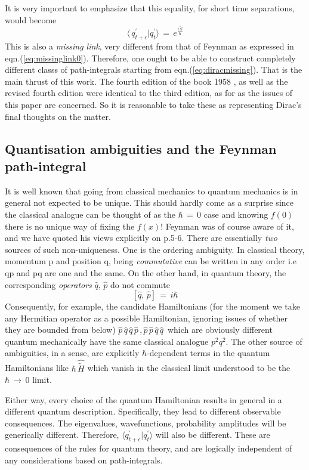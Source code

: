 \documentclass[a4paper]{JHEP3}
\newcommand{\be}{\begin{equation}}
\newcommand{\ee}{\end{equation}}
\begin{document}
It is very important to emphasize that this equality, for short time separations, would become
\be
\label{eq:diracmissing}
\langle\,q^\prime_{t+\epsilon}|q^{\prime}_t\rangle\,
=\,e^{\frac{i\,{\tilde S}}{\hbar}}
\ee
This is also a \emph{missing link}, very different from that of Feynman as expressed in eqn.(\ref{eq:missinglink0}). Therefore, one ought
to be able to construct completely different classs of path-integrals starting from eqn.(\ref{eq:diracmissing}). That is the main thrust
of this work.
The fourth edition of the
book 1958 \cite{diracbook4}, as well as the revised fourth edition \cite{diracbook4r} were identical to the third edition, as for as the
issues of this paper are concerned. So it is reasonable to take these as representing Dirac's final thoughts on the matter.

\subsection{Quantisation ambiguities and the Feynman path-integral}
It is well known that going from classical mechanics to quantum mechanics is in general not expected to be unique. This should hardly come as a
surprise since the classical analogue can be thought of as the $\hbar\,=\,0$ case and knowing  $f(0)$ there is no unique way of fixing
the $f(x)$! Feynman was of course aware of it, and we have quoted his views explicitly on p.5-6. There are essentially \emph{two} sources
of such non-uniqueness. One 
is the ordering ambiguity. In classical theory, momentum p and position q, being {\it commutative} can be written in any
order i.e qp and pq are one and the same. On the other hand, in quantum theory, the corresponding {\it operators} ${\hat q},\,{\hat p}$
do not commute
\be
\label{eq:heisenbergalgebra}
[{\hat q},\,{\hat p}]\,=\,i\hbar
\ee
Consequently, for example, the candidate Hamiltonians (for the moment we take any Hermitian operator as a possible Hamiltonian, ignoring
issues of whether they are bounded from below) ${\hat p}\,{\hat q}\,{\hat q}\,{\hat p}\,, {\hat p}\,{\hat p}\,{\hat q}\,{\hat q}\,$ which are 
obviously different quantum mechanically have the same classical analogue $p^2q^2$.  The other source of ambiguities, in a sense, are 
explicitly $\hbar$-dependent terms in the quantum Hamiltonians like $\hbar\,{\hat{\tilde H}}$
which vanish in the classical limit understood to be the $\hbar\,\rightarrow\,0$ limit. 

Either way, every choice of the quantum Hamiltonian results in general in a different
quantum description. Specifically, they lead to different observable consequences. The eigenvalues, wavefunctions, probability amplitudes
will be generically different. Therefore, $\langle q_{t+\epsilon}^\prime|q_t^\prime\rangle$ will also be different. These are consequences
of the rules for quantum theory, and are logically independent of any considerations based on path-integrals. 
\end{document}
